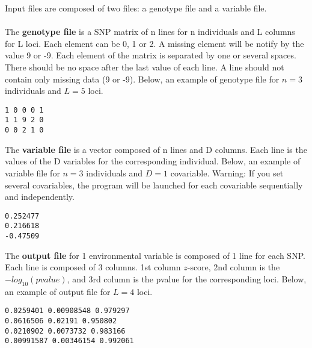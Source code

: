 \documentclass[10pt,a4paper]{article}
\begin{document}
Input files are composed of two files: a genotype file and a variable file. 
\\
\\
The {\bf genotype file} is a SNP
matrix of n lines for n individuals and L columns for L loci. Each element can be 0, 1 or 2. A missing 
element will be notify by the value 9 or -9. Each element of the matrix is separated by one or several 
spaces. There should be no space after the last value of each line.
A line should not contain only missing data (9 or -9).
Below, an example of genotype file for $n=3$ individuals and $L=5$ loci.

\begin{center}
\begin{Verbatim}[frame=single]
1 0 0 0 1
1 1 9 2 0
0 0 2 1 0
\end{Verbatim}
\end{center}

\noindent
The {\bf variable file} is a vector composed of n lines and D columns. 
Each line is the values of the D variables for the 
corresponding individual. Below, an example of variable file for $n=3$ individuals and $D=1$ covariable.
Warning: If you set several covariables, the program will be launched for each covariable sequentially
and independently.

\begin{center}
\begin{Verbatim}[frame=single]
0.252477
0.216618
-0.47509
\end{Verbatim}
\end{center}

\noindent
The {\bf output file} for 1 environmental variable is composed of 1 line for each SNP.
Each line is composed of 3 columns.
1st column $z$-score, 2nd column is the $-log_{10}(pvalue)$, and 3rd column is the pvalue
for the corresponding loci. Below, an example of output file for $L=4$ loci.

\begin{center}
\footnotesize
\begin{Verbatim}[frame=single]
0.0259401 0.00908548 0.979297
0.0616506 0.02191 0.950802
0.0210902 0.0073732 0.983166
0.00991587 0.00346154 0.992061
\end{Verbatim}
\end{center}

\end{document}
